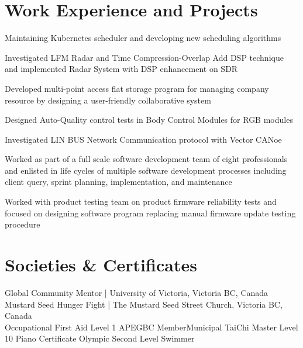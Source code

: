 \documentclass[]{deedy-resume-openfont}
\begin{document}
\begin{minipage}[t]{0.66\textwidth}
\section{Work Experience and Projects}
Maintaining Kubernetes scheduler and developing new scheduling algorithms
\sectionsep

Investigated LFM Radar and Time Compression-Overlap Add DSP technique and implemented Radar System with DSP enhancement on SDR
\sectionsep

\begin{tightemize}
\item Developed multi-point access flat storage program for managing company resource by designing a user-friendly collaborative system
\item Designed Auto-Quality control tests in Body Control Modules for RGB modules
\item Investigated LIN BUS Network Communication protocol with Vector CANoe
\end{tightemize}
\sectionsep

Worked as part of a full scale software development team of eight professionals and enlisted in life cycles of multiple software development processes including client query, sprint planning, implementation, and maintenance
\sectionsep

Worked with product testing team on product firmware reliability tests and focused on designing software program replacing manual firmware update testing procedure
\sectionsep


\section{Societies \& Certificates} 
Global Community Mentor | University of Victoria, Victoria BC, Canada\\
Mustard Seed Hunger Fight | The Mustard Seed Street Church, Victoria BC, Canada\\
Occupational First Aid Level 1 \textbullet
APEGBC Member\textbullet Municipal TaiChi Master \textbullet Level 10 Piano Certificate \textbullet Olympic Second Level Swimmer
\sectionsep


\end{minipage} 
\end{document}
